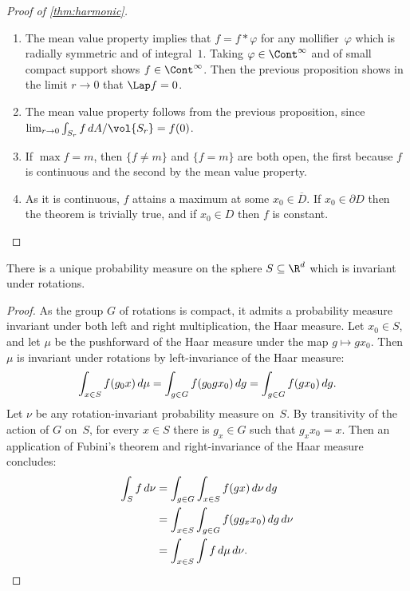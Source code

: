 \begin	{proof}[Proof of \autoref{thm:harmonic}]\leavevmode
\begin	{enumerate}
\item	The mean value property implies that \( f = f * \varphi \)
	for any mollifier~$\varphi$ which is radially symmetric
	and of integral~$1$.
	Taking \( \varphi \in \Cont^\infty \) and of small compact support
	shows \( f \in \Cont^\infty \).
	Then the previous proposition shows in the limit \( r \to 0 \)
	that \( \Lap f = 0 \).
\item	The mean value property follows from the previous proposition,
	since \( \lim_{r\to0} \int_{S_r} f \,dA/\vol{S_r} = f(0) \).
\item	If \( \max f = m \),
	then \( \{f \ne m\} \) and \( \{f = m\} \) are both open,
	the first because $f$ is continuous
	and the second by the mean value property.
\item	As it is continuous,
	$f$ attains a maximum at some \(x_0 \in \overline D\).
	If \( x_0 \in \partial D \) then the theorem is trivially true,
	and if \( x_0 \in D \) then $f$ is constant.
\qedhere
\end	{enumerate}
\end	{proof}

\begin	{lemma}
There is a unique probability measure on the sphere \( S \subseteq \R^d \)
which is invariant under rotations.
\end	{lemma}
\begin	{proof}
As the group $G$ of rotations is compact,
it admits a probability measure invariant
under both left and right multiplication,
the Haar measure.
Let \( x_0 \in S \),
and let $\mu$ be the pushforward of the Haar measure
under the map \( g \mapsto gx_0 \).
Then $\mu$ is invariant under rotations
by left-invariance of the Haar measure:
\[ \int_{x \in S} f(g_0x) \,d\mu = \int_{g \in G} f(g_0gx_0) \,dg
	= \int_{g \in G} f(gx_0) \,dg \text. \]
Let $\nu$ be any rotation-invariant probability measure on~$S$.
By transitivity of the action of $G$ on~$S$,
for every \( x \in S \) there is \( g_x \in G \)
such that \( g_x x_0 = x \).
Then an application of Fubini's theorem
and right-invariance of the Haar measure concludes:
\begin	{align*}
\int_S f \,d\nu
&=	\int_{g \in G} \int_{x \in S} f(gx) \,d\nu \,dg	\\
&=	\int_{x \in S} \int_{g \in G} f(gg_xx_0) \,dg \,d\nu \\
&=	\int_{x \in S} \int f \,d\mu \,d\nu \text.
\qedhere
\end	{align*}
\end	{proof}

